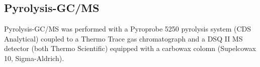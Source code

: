 \documentclass[authoryear,preprint,review,12pt]{elsarticle}
\begin{document}
                                                                                                                                                                                                                                                                                                                                                                                                                                                                                                                                                                                                                                                                                                                                                                                                                                                                                                                                                                                                                                                                                                                              \subsection{Pyrolysis-GC/MS}
                                                                                                                                                                                                                                                                                                                                                                                                                                                                                                                                                                                                                                                                                                                                                                                                                                                                                                                                                                                                                                                                                                                              Pyrolysis-GC/MS was performed with a Pyroprobe 5250 pyrolysis system (CDS Analytical) coupled to a Thermo Trace gas chromatograph and a DSQ II MS detector (both Thermo Scientific) equipped with a carbowax colomn (Supelcowax 10, Sigma-Aldrich).
\end{document}
